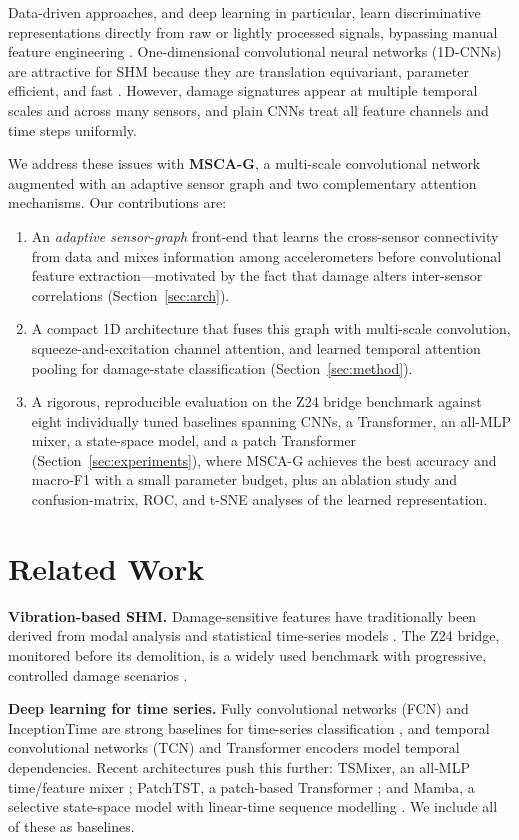 \documentclass[11pt]{article}
\begin{document}
Data-driven approaches, and deep learning in particular, learn discriminative
representations directly from raw or lightly processed signals, bypassing manual
feature engineering \cite{azimi2020data}. One-dimensional convolutional neural
networks (1D-CNNs) are attractive for SHM because they are translation
equivariant, parameter efficient, and fast \cite{abdeljaber2017real}. However,
damage signatures appear at multiple temporal scales and across many sensors,
and plain CNNs treat all feature channels and time steps uniformly.

We address these issues with \textbf{MSCA-G}, a multi-scale convolutional network
augmented with an adaptive sensor graph and two complementary attention
mechanisms. Our contributions are:
\begin{enumerate}
  \item An \emph{adaptive sensor-graph} front-end that learns the cross-sensor
  connectivity from data and mixes information among accelerometers before
  convolutional feature extraction---motivated by the fact that damage alters
  inter-sensor correlations (Section~\ref{sec:arch}).
  \item A compact 1D architecture that fuses this graph with multi-scale
  convolution, squeeze-and-excitation channel attention, and learned temporal
  attention pooling for damage-state classification (Section~\ref{sec:method}).
  \item A rigorous, reproducible evaluation on the Z24 bridge benchmark against
  eight individually tuned baselines spanning CNNs, a Transformer, an all-MLP
  mixer, a state-space model, and a patch Transformer
  (Section~\ref{sec:experiments}), where MSCA-G achieves the best accuracy and
  macro-F1 with a small parameter budget, plus an ablation study and
  confusion-matrix, ROC, and t-SNE analyses of the learned
  representation.
\end{enumerate}

\section{Related Work}
\label{sec:related}
\textbf{Vibration-based SHM.} Damage-sensitive features have traditionally been
derived from modal analysis and statistical time-series models
\cite{farrar2012structural}. The Z24 bridge, monitored before its demolition,
is a widely used benchmark with progressive, controlled damage scenarios
\cite{maeck2003z24}.

\textbf{Deep learning for time series.} Fully convolutional networks (FCN) and
InceptionTime are strong baselines for time-series classification
\cite{wang2017time,fawaz2020inceptiontime}, and temporal convolutional networks
(TCN) \cite{bai2018empirical} and Transformer encoders \cite{vaswani2017attention}
model temporal dependencies. Recent architectures push this further: TSMixer, an
all-MLP time/feature mixer \cite{chen2023tsmixer}; PatchTST, a patch-based
Transformer \cite{nie2023patchtst}; and Mamba, a selective state-space model with
linear-time sequence modelling \cite{gu2023mamba}. We include all of these as
baselines.
\end{document}

